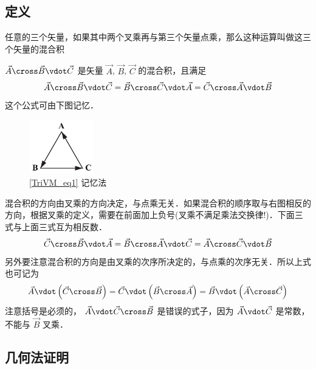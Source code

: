 
\subsection{定义}

任意的三个矢量，如果其中两个叉乘再与第三个矢量点乘，那么这种运算叫做这三个矢量的混合积

$\vec A \cross \vec B \vdot \vec C$ 是矢量 $\vec A$, $\vec B$, $\vec C$ 的混合积，且满足
\begin{equation}\label{TriVM_eq1}
\vec A \cross \vec B \vdot \vec C = \vec B \cross \vec C \vdot \vec A = \vec C \cross \vec A \vdot \vec B 
\end{equation} 
这个公式可由下图记忆．
\begin{figure}[h]
\centering
\includegraphics[width=0.25\textwidth]{./figures/TriVM.pdf}
\caption{\autoref{TriVM_eq1} 记忆法}
\end{figure}
混合积的方向由叉乘的方向决定，与点乘无关．如果混合积的顺序取与右图相反的方向，根据叉乘的定义，需要在前面加上负号(叉乘不满足乘法交换律!)．下面三式与上面三式互为相反数．
\begin{equation}
\vec C \cross \vec B \vdot \vec A = \vec B \cross \vec A \vdot \vec C = \vec A \cross \vec C \vdot \vec B
\end{equation} 
另外要注意混合积的方向是由叉乘的次序所决定的，与点乘的次序无关．所以上式也可记为
 \begin{equation}
\vec A \vdot \left( {\vec C \cross \vec B} \right) = \vec C \vdot \left( {\vec B \cross \vec A} \right) = \vec B \vdot \left( {\vec A \cross \vec C} \right)
\end{equation} 
注意括号是必须的， $\vec A \vdot \vec C \cross \vec B$ 是错误的式子，因为 $\vec A \vdot \vec C$ 是常数，不能与 $\vec B$ 叉乘．


\subsection{几何法证明}

